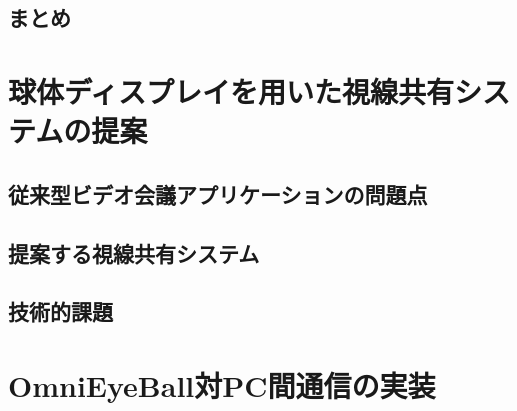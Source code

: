 \documentclass[11pt,oneside,openany,report]{jsbook}
\begin{document}
\section{まとめ}

\chapter{球体ディスプレイを用いた視線共有システムの提案}
\section{従来型ビデオ会議アプリケーションの問題点}
\section{提案する視線共有システム}
\section{技術的課題}

\chapter{OmniEyeBall対PC間通信の実装}
\end{document}

